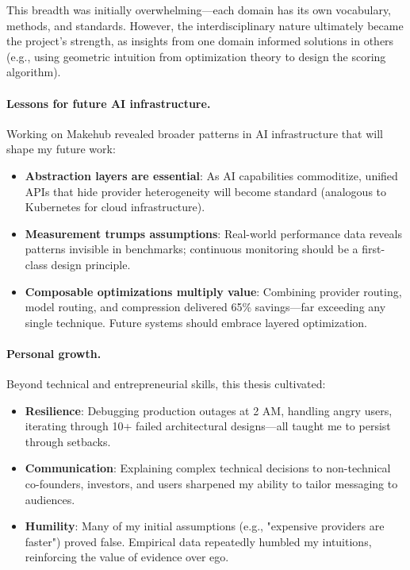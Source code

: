 \documentclass[english]{article}
\begin{document}
This breadth was initially overwhelming—each domain has its own vocabulary, methods, and standards. However, the interdisciplinary nature ultimately became the project's strength, as insights from one domain informed solutions in others (e.g., using geometric intuition from optimization theory to design the scoring algorithm).

\paragraph{Lessons for future AI infrastructure.}

Working on Makehub revealed broader patterns in AI infrastructure that will shape my future work:
\begin{itemize}
    \item \textbf{Abstraction layers are essential}: As AI capabilities commoditize, unified APIs that hide provider heterogeneity will become standard (analogous to Kubernetes for cloud infrastructure).
    \item \textbf{Measurement trumps assumptions}: Real-world performance data reveals patterns invisible in benchmarks; continuous monitoring should be a first-class design principle.
    \item \textbf{Composable optimizations multiply value}: Combining provider routing, model routing, and compression delivered 65\% savings—far exceeding any single technique. Future systems should embrace layered optimization.
\end{itemize}

\paragraph{Personal growth.}

Beyond technical and entrepreneurial skills, this thesis cultivated:
\begin{itemize}
    \item \textbf{Resilience}: Debugging production outages at 2 AM, handling angry users, iterating through 10+ failed architectural designs—all taught me to persist through setbacks.
    \item \textbf{Communication}: Explaining complex technical decisions to non-technical co-founders, investors, and users sharpened my ability to tailor messaging to audiences.
    \item \textbf{Humility}: Many of my initial assumptions (e.g., "expensive providers are faster") proved false. Empirical data repeatedly humbled my intuitions, reinforcing the value of evidence over ego.
\end{itemize}
\end{document}
